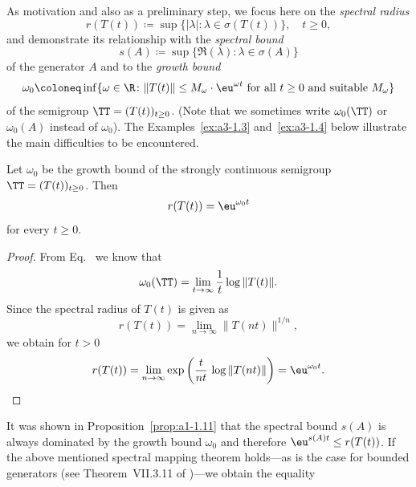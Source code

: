 As motivation and also as a preliminary step, we focus here on the \emph{spectral radius}
\begin{equation}\label{eq:a3-1.1}
	r(T(t)) \coloneq  \sup \{ |\lambda| \colon \lambda \in \sigma(T(t)) \}, \quad t \geq 0 ,
\end{equation}
and demonstrate its relationship with the \emph{spectral bound}
\begin{equation}\label{eq:a3-1.2}
	s(A) \coloneq  \sup \{ \Re(\lambda) \colon \lambda \in \sigma(A) \}
\end{equation}
of the generator $A$ and to the \emph{growth bound}
\begin{equation}\label{eq:a3-1.3}
	\omega_{0} \coloneq  \inf \{\omega \in \R  \colon \|T(t)\| \leq M_{\omega}\cdot \eu^{\omega t} \text{ for all } t \geq 0 \text{ and suitable } M_{\omega}\}
\end{equation}
of the semigroup $\TT = (T(t))_{t\geq 0}$.
(Note that we sometimes write $\omega_{0}(\TT)$ or $\omega_{0}(A)$ instead of\/ $\omega_{0}$).
%
The Examples~\ref{ex:a3-1.3} and~\ref{ex:a3-1.4} below illustrate the main difficulties to be encountered.
\begin{proposition}\label{prop:a3-1.1}
Let $\omega_{0}$ be the growth bound of the strongly continuous semigroup $\TT = (T(t))_{t\geq 0}$.
Then
\begin{equation}\label{eq:a3-1.4}
	r(T(t)) = \eu^{\omega_{0} t}
\end{equation}
for every $t \geq 0$.
\end{proposition}
\begin{proof}
From Eq.~ we know that
\[
    \omega_{0}(\TT) = \lim_{t \to \infty} \frac{1}{t} \log \|T(t)\| .
\]
Since the spectral radius of\/ $T(t)$ is given as
\[
    r(T(t)) = \lim_{n \to \infty} \|T(nt)\|^{1/n} ,
\]
we obtain for $t > 0$
\[
    r(T(t)) = \lim_{n \to \infty} \exp\left( \frac{t}{nt}\,\log \|T(nt)\|\right) = \eu^{\omega_{0} t} .
    \qedhere
\]
\end{proof}
It was shown in Proposition~\ref{prop:a1-1.11} that the spectral bound $s(A)$ is always dominated by the growth bound $\omega_{0}$ and therefore $\eu^{s(A)t} \leq r(T(t))$.
If the above mentioned spectral mapping theorem holds---as is the case for bounded generators (\eg see Theorem~VII.3.11 of \textcite{dunfordschwartz:1958})---we obtain the equality
